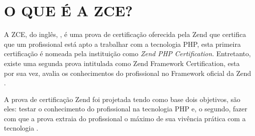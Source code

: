 \chapter{O QUE É A ZCE?}
\label{zce}

A ZCE, do inglês, \textit{\ZCE}, é uma prova de certificação oferecida
pela Zend que certifica que um profissional está apto a trabalhar com a tecnologia PHP, 
esta primeira certificação é nomeada pela instituição como \textit{Zend PHP
Certification}. Entretanto, existe uma segunda prova intitulada como Zend
Framework Certification, esta por sua vez, avalia os conhecimentos do profissional 
no Framework oficial da Zend \cite{websiteZendZce}. 

A prova de certificação Zend foi projetada tendo como base dois objetivos, são
eles: testar o conhecimento do profissional na tecnologia PHP e, o segundo, fazer 
com que a prova extraia do profissional o máximo de sua vivência prática com a 
tecnologia \cite{theZendPHPCertificationPracticeTestBook}.
